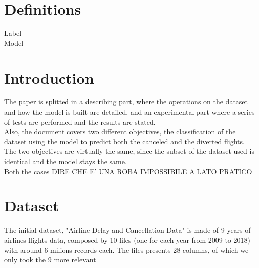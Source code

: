 \documentclass[
	letterpaper, %
	10pt, %
]{class}
\begin{document}
\section{Definitions}\label{definitions} %

\begin{description}
    \item[Label]
    \item[Model]
\end{description}


\section{Introduction}

The paper is splitted in a describing part, where the operations on the dataset and how the model is built are detailed, and an experimental part where a series of tests are performed and the results are stated.\\
Also, the document covers two different objectives, the classification of the dataset using the model to predict both the canceled and the diverted flights.\\
The two objectives are virtually the same, since the subset of the dataset used is identical and the model stays the same.\\
Both the cases DIRE CHE E' UNA ROBA IMPOSSIBILE A LATO PRATICO


\section{Dataset}

The initial dataset, "Airline Delay and Cancellation Data" \cite{dataset} is made of 9 years of airlines flights data, composed by 10 files (one for each year from 2009 to 2018) with around 6 milions records each.
The files presents 28 columns, of which we only took the 9 more relevant\\
\end{document}

